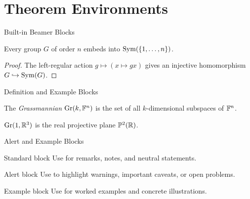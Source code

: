 \documentclass{beamer}
\begin{document}
\section{Theorem Environments}


\begin{frame}{Built-in Beamer Blocks}
    \begin{theorem}[Cayley]
        Every group $G$ of order $n$ embeds into $\mathrm{Sym}(\{1,\ldots,n\})$.
    \end{theorem}

    \pause

    \begin{proof}
        The left-regular action $g \mapsto (x \mapsto gx)$ gives an
        injective homomorphism $G \hookrightarrow \mathrm{Sym}(G)$.
    \end{proof}
\end{frame}

\begin{frame}{Definition and Example Blocks}
    \begin{definition}
        The \emph{Grassmannian} $\mathrm{Gr}(k, \mathbb{F}^{n})$ is the set of all
        $k$-dimensional subspaces of $\mathbb{F}^{n}$.
    \end{definition}

    \pause

    \begin{example}
        $\mathrm{Gr}(1, \mathbb{R}^{3})$ is the real projective plane $\mathbb{P}^{2}(\mathbb{R})$.
    \end{example}
\end{frame}

\begin{frame}{Alert and Example Blocks}
    \begin{block}{Standard block}
        Use for remarks, notes, and neutral statements.
    \end{block}

    \begin{alertblock}{Alert block}
        Use to highlight warnings, important caveats, or open problems.
    \end{alertblock}

    \begin{exampleblock}{Example block}
        Use for worked examples and concrete illustrations.
    \end{exampleblock}
\end{frame}
\end{document}
